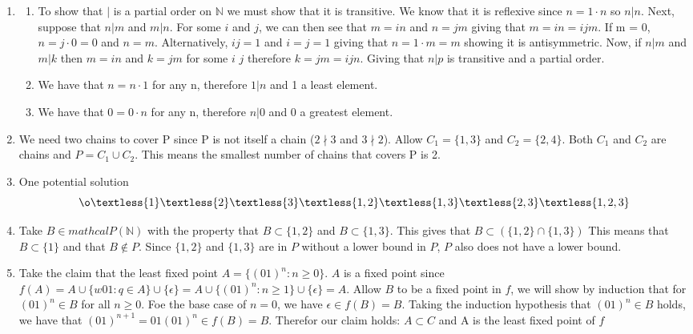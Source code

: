 \documentclass{article}
\begin{document}
\begin{enumerate}
        \item  
            \begin{enumerate}[label=\arabic*)]
                \item To show that $|$ is a partial order on $\mathds{N}$ we must show that it is transitive. We know that it is reflexive since $n=1 \cdot n$ so $n|n$. Next, suppose that $n|m$ and $m|n$. For some $i$ and $j$, we can then see that $m=in$ and $n=jm$ giving that $ m = in = ijm$. If m = 0, $n=j \cdot 0 = 0$ and $n=m$. Alternatively, $ij = 1$ and $i = j = 1$ giving that $n = 1 \cdot m = m$ showing it is antisymmetric. Now, if $n|m$ and $m | k$ then $m = in$ and $k = jm$ for some $i$ $j$ therefore $k = jm = ijn$. Giving that $n|p$ is transitive and a partial order. 
                \item We have that $ n = n \cdot 1$ for any n, therefore $1|n$ and 1 a least element.
                \item We have that $ 0 = 0 \cdot n$ for any n, therefore $n|0$ and 0 a greatest element.
            \end{enumerate}
        \item We need two chains to cover P since P is not itself a chain ($2\nmid 3$ and $3\nmid 2$). Allow $C_1 = \{1,3\}$ and $C_2 = \{2,4\}$. Both $C_1$ and $C_2$ are chains and $P=C_1\cup C_2$. This means the smallest number of chains that covers P is 2. 
        \item One potential solution
        $$\o \textless \{1\}\textless \{2\}\textless \{3\}\textless \{1,2\}\textless \{1,3\}\textless \{2,3\}\textless \{1,2,3\} $$
        \item Take $B \in mathcal{P}(\mathds{N})$ with the property that $B \subset \{1,2\}$ and $B \subset \{1,3\}$. This gives that $B \subset (\{1,2\} \cap \{1,3\})$ This means that $B \subset \{1\}$ and that $B \notin P$. Since $\{1,2\}$ and $\{1,3\}$ are in $P$ without a lower bound in $P$, $P$ also does not have a lower bound. 
        \item Take the claim that the least fixed point $A = \{(01)^n : n\geq 0\}$. $A$ is a fixed point since $f(A) = A \cup \{w01 : q \in A\} \cup \{\epsilon \} = A \cup \{(01)^n : n\geq 1\}\cup \{\epsilon \}=A$. Allow $B$ to be a fixed point in $f$, we will show by induction that for $(01)^n \in B$ for all $n\geq 0$. Foe the base case of $n=0$, we have $\epsilon \in f(B) = B$. Taking the induction hypothesis that $(01)^n \in B$ holds, we have that $(01)^{n+1} = 01(01)^n \in f(B)=B$. Therefor our claim holds: $A\subset C$ and A is the least fixed point of $f$
    \end{enumerate}
\end{document}
